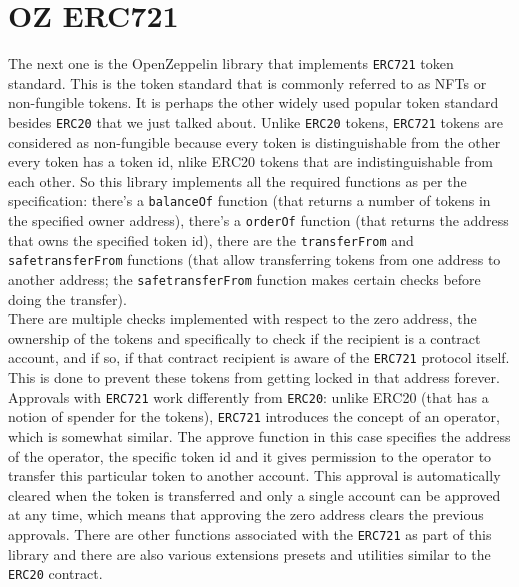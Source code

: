 \section{OZ ERC721}
The next one is the OpenZeppelin library that implements \verb|ERC721| token standard. This is the token standard that is commonly referred to as NFTs or non-fungible tokens. It is perhaps the other widely used popular token standard besides \verb|ERC20| that we just talked about. Unlike \verb|ERC20| tokens, \verb|ERC721| tokens are considered as non-fungible because every token is distinguishable from the other every token has a token id, nlike ERC20 tokens that are indistinguishable from each other. So this library implements all the required functions as per the specification: there's a \verb|balanceOf| function (that returns a number of tokens in the specified owner address), there's a \verb|orderOf| function (that returns the address that owns the specified token id), there are the \verb|transferFrom| and \verb|safetransferFrom| functions (that allow transferring tokens from one address to another address; the \verb|safetransferFrom| function makes certain checks before doing the transfer).\\

There are multiple checks implemented with respect to the zero address, the ownership of the tokens and specifically to check if the recipient is a contract account, and if so, if that contract recipient is aware of the \verb|ERC721| protocol itself. This is done to prevent these tokens from getting locked in that address forever. Approvals with \verb|ERC721| work differently from \verb|ERC20|: unlike ERC20 (that has a notion of spender for the tokens), \verb|ERC721| introduces the concept of an operator, which is somewhat similar. The approve function in this case specifies the address of the operator, the specific token id and it gives permission to the operator to transfer this particular token to another account. This approval is automatically cleared when the token is transferred and only a single account can be approved at any time, which means that approving the zero address clears the previous approvals. There are other functions associated with the \verb|ERC721| as part of this library and there are also various extensions presets and utilities similar to the \verb|ERC20| contract.


